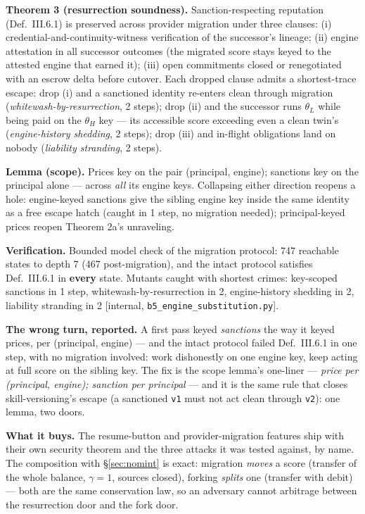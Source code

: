 \documentclass[11pt,a4paper]{article}
\begin{document}
\begin{thebox}
\textbf{Theorem 3 (resurrection soundness).} Sanction-respecting reputation (Def.~III.6.1) is preserved across provider migration
under three clauses: (i) credential-and-continuity-witness verification of the successor's lineage; (ii) engine attestation in all
successor outcomes (the migrated score stays keyed to the attested engine that earned it); (iii) open commitments closed or
renegotiated with an escrow delta before cutover. Each dropped clause admits a shortest-trace escape: drop (i) and a sanctioned
identity re-enters clean through migration (\emph{whitewash-by-resurrection}, 2 steps); drop (ii) and the successor runs
$\theta_L$ while being paid on the $\theta_H$ key --- its accessible score exceeding even a clean twin's
(\emph{engine-history shedding}, 2 steps); drop (iii) and in-flight obligations land on nobody (\emph{liability stranding}, 2
steps).

\textbf{Lemma (scope).} Prices key on the pair (principal, engine); sanctions key on the principal alone --- across \emph{all} its
engine keys. Collapsing either direction reopens a hole: engine-keyed sanctions give the sibling engine key inside the same
identity as a free escape hatch (caught in 1 step, no migration needed); principal-keyed prices reopen Theorem 2a's unraveling.

\textbf{Verification.} Bounded model check of the migration protocol: 747 reachable states to depth 7 (467 post-migration), and
the intact protocol satisfies Def.~III.6.1 in \textbf{every} state. Mutants caught with shortest crimes: key-scoped sanctions in 1
step, whitewash-by-resurrection in 2, engine-history shedding in 2, liability stranding in 2 [internal,
\texttt{b5\_\allowbreak engine\_\allowbreak substitution.py}].
\end{thebox}

\textbf{The wrong turn, reported.} A first pass keyed \emph{sanctions} the way it keyed prices, per (principal, engine) --- and
the intact protocol failed Def.~III.6.1 in one step, with no migration involved: work dishonestly on one engine key, keep acting at
full score on the sibling key. The fix is the scope lemma's one-liner --- \emph{price per (principal, engine); sanction per
principal} --- and it is the same rule that closes skill-versioning's escape (a sanctioned \texttt{v1} must not act clean through
\texttt{v2}): one lemma, two doors.

\textbf{What it buys.} The resume-button and provider-migration features ship with their own security theorem and the three attacks
it was tested against, by name. The composition with \S\ref{sec:nomint} is exact: migration \emph{moves} a score (transfer of the
whole balance, $\gamma=1$, sources closed), forking \emph{splits} one (transfer with debit) --- both are the same conservation law,
so an adversary cannot arbitrage between the resurrection door and the fork door.
\end{document}

